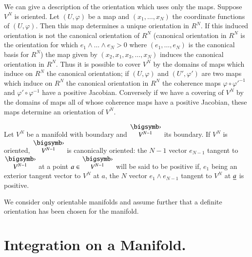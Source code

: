 We can give a description of the orientation which uses only the
maps. Suppose $V^{N}$ is oriented. Let $(U,\varphi)$ be a map and
$(x_{1},\ldots,x_{N})$ the coordinate functions of $(U,\varphi)$. Then
this map determines a unique orientation in $R^{N}$. If this induced
orientation is not the canonical orientation of $R^{N}$ (canonical
orientation in $R^{N}$ is the orientation for which
$e_{1}\wedge\ldots\wedge e_{N}>0$ where $(e_{1},\ldots,e_{N})$ is the
canonical basis for $R^{N}$) the map given by
$(x_{2},x_{1},x_{3},\ldots,x_{N})$ induces the canonical orientation
in $R^{N}$. Thus it is possible to cover $V^{N}$ by the domains of
maps which induce on $R^{N}$ the canonical orientation; if
$(U,\varphi)$ and $(U',\varphi')$ are two maps which induce on $R^{N}$
the canonical orientation in $R^{N}$ the coherence maps $\varphi\circ
{\varphi'}^{-1}$ and $\varphi'\circ \varphi^{-1}$ have a positive
Jacobian. Conversely if we have a covering of $V^{N}$ by the domains
of maps all of whose coherence maps have a positive Jacobian, these
maps determine an orientation of $V^{N}$. 

Let $V^{N}$ be a manifold with boundary and
$\overset{\bigdot}{V^{N-1}}$ its boundary. If $V^{N}$ is oriented,
$\overset{\bigdot}{V^{N-1}}$ is canonically oriented: the $N-1$ vector
$e_{N-1}$ tangent to $\overset{\bigdot}{V^{N-1}}$ at a point $a\in
\overset{\bigdot}{V^{N-1}}$ will be said to be positive if, $e_{1}$
being an exterior tangent vector to $V^{N}$ at $a$, the $N$ vector
$e_{1}\wedge e_{N-1}$ tangent to $V^{N}$ at $\underline{a}$ is positive.

We consider only orientable manifolds and assume further that a
definite orientation has been chosen for the manifold.

\section*{Integration on a Manifold.}

